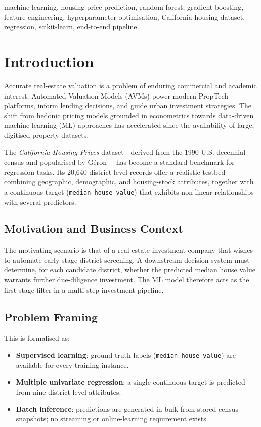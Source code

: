 \documentclass[conference]{IEEEtran}
\begin{document}
\begin{IEEEkeywords}
machine learning, housing price prediction, random forest, gradient boosting, feature engineering, hyperparameter optimisation, California housing dataset, regression, scikit-learn, end-to-end pipeline
\end{IEEEkeywords}

\section{Introduction}
\label{sec:intro}

Accurate real-estate valuation is a problem of enduring commercial and academic interest. Automated Valuation Models (AVMs) power modern PropTech platforms, inform lending decisions, and guide urban investment strategies. The shift from hedonic pricing models grounded in econometrics \cite{rosen1974hedonic} towards data-driven machine learning (ML) approaches has accelerated since the availability of large, digitised property datasets.

The \emph{California Housing Prices} dataset—derived from the 1990 U.S. decennial census and popularised by Géron \cite{geron2019}—has become a standard benchmark for regression tasks. Its 20,640 district-level records offer a realistic testbed combining geographic, demographic, and housing-stock attributes, together with a continuous target (\texttt{median\_house\_value}) that exhibits non-linear relationships with several predictors.

\subsection{Motivation and Business Context}

The motivating scenario is that of a real-estate investment company that wishes to automate early-stage district screening. A downstream decision system must determine, for each candidate district, whether the predicted median house value warrants further due-diligence investment. The ML model therefore acts as the first-stage filter in a multi-step investment pipeline.

\subsection{Problem Framing}

This is formalised as:
\begin{itemize}
    \item \textbf{Supervised learning}: ground-truth labels (\texttt{median\_house\_value}) are available for every training instance.
    \item \textbf{Multiple univariate regression}: a single continuous target is predicted from nine district-level attributes.
    \item \textbf{Batch inference}: predictions are generated in bulk from stored census snapshots; no streaming or online-learning requirement exists.
\end{itemize}
\end{document}
